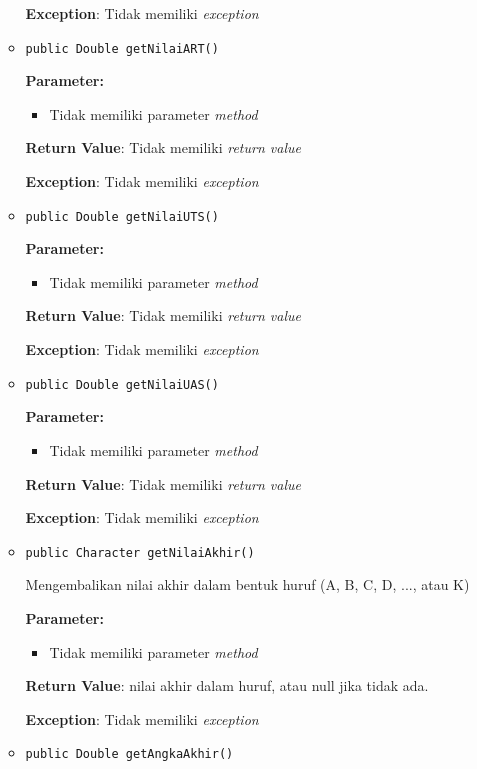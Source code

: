 \documentclass{article}
\begin{document}
\begin{enumerate}
\begin{itemize}
\textbf{Exception}: Tidak memiliki \textit{exception}

\item \texttt{public Double getNilaiART()}



\textbf{Parameter:}
\begin{itemize}
\item Tidak memiliki parameter \textit{method}
\end{itemize}
\textbf{Return Value}: Tidak memiliki \textit{return value}

\textbf{Exception}: Tidak memiliki \textit{exception}

\item \texttt{public Double getNilaiUTS()}



\textbf{Parameter:}
\begin{itemize}
\item Tidak memiliki parameter \textit{method}
\end{itemize}
\textbf{Return Value}: Tidak memiliki \textit{return value}

\textbf{Exception}: Tidak memiliki \textit{exception}

\item \texttt{public Double getNilaiUAS()}



\textbf{Parameter:}
\begin{itemize}
\item Tidak memiliki parameter \textit{method}
\end{itemize}
\textbf{Return Value}: Tidak memiliki \textit{return value}

\textbf{Exception}: Tidak memiliki \textit{exception}

\item \texttt{public Character getNilaiAkhir()}

Mengembalikan nilai akhir dalam bentuk huruf (A, B, C, D, ..., atau K)

\textbf{Parameter:}
\begin{itemize}
\item Tidak memiliki parameter \textit{method}
\end{itemize}
\textbf{Return Value}: nilai akhir dalam huruf, atau null jika tidak ada.

\textbf{Exception}: Tidak memiliki \textit{exception}

\item \texttt{public Double getAngkaAkhir()}


\end{itemize}
\end{enumerate}
\end{document}
